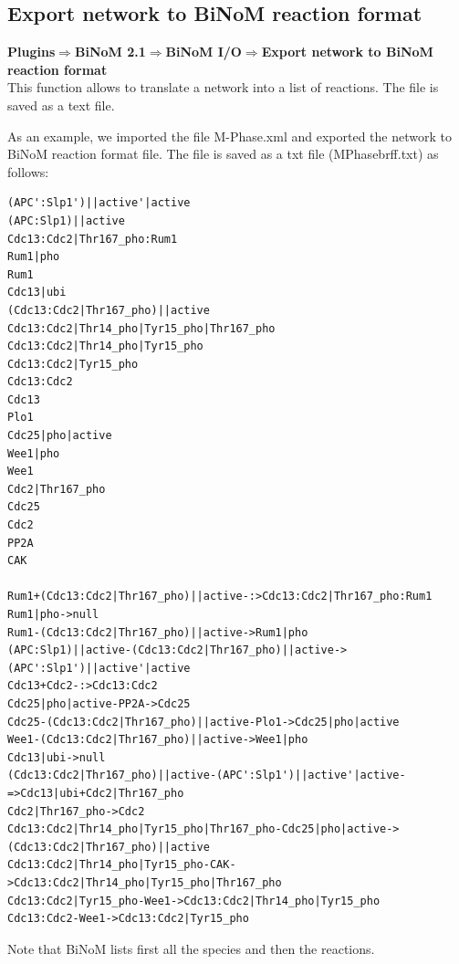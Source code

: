 \subsection{Export network to BiNoM reaction format}
\textbf{Plugins$\Rightarrow$BiNoM 2.1$\Rightarrow$BiNoM I/O$\Rightarrow$Export network to BiNoM reaction format}\\

This function allows to translate a network into a list of reactions. The file is saved as a text file.

As an example, we imported the file M-Phase.xml and exported the network to BiNoM reaction format file. The file is saved as a txt file (MPhasebrff.txt) as follows: 

\begin{verbatim}
(APC':Slp1')||active'|active
(APC:Slp1)||active
Cdc13:Cdc2|Thr167_pho:Rum1
Rum1|pho
Rum1
Cdc13|ubi
(Cdc13:Cdc2|Thr167_pho)||active
Cdc13:Cdc2|Thr14_pho|Tyr15_pho|Thr167_pho
Cdc13:Cdc2|Thr14_pho|Tyr15_pho
Cdc13:Cdc2|Tyr15_pho
Cdc13:Cdc2
Cdc13
Plo1
Cdc25|pho|active
Wee1|pho
Wee1
Cdc2|Thr167_pho
Cdc25
Cdc2
PP2A
CAK

Rum1+(Cdc13:Cdc2|Thr167_pho)||active-:>Cdc13:Cdc2|Thr167_pho:Rum1
Rum1|pho->null
Rum1-(Cdc13:Cdc2|Thr167_pho)||active->Rum1|pho
(APC:Slp1)||active-(Cdc13:Cdc2|Thr167_pho)||active->(APC':Slp1')||active'|active
Cdc13+Cdc2-:>Cdc13:Cdc2
Cdc25|pho|active-PP2A->Cdc25
Cdc25-(Cdc13:Cdc2|Thr167_pho)||active-Plo1->Cdc25|pho|active
Wee1-(Cdc13:Cdc2|Thr167_pho)||active->Wee1|pho
Cdc13|ubi->null
(Cdc13:Cdc2|Thr167_pho)||active-(APC':Slp1')||active'|active-=>Cdc13|ubi+Cdc2|Thr167_pho
Cdc2|Thr167_pho->Cdc2
Cdc13:Cdc2|Thr14_pho|Tyr15_pho|Thr167_pho-Cdc25|pho|active->(Cdc13:Cdc2|Thr167_pho)||active
Cdc13:Cdc2|Thr14_pho|Tyr15_pho-CAK->Cdc13:Cdc2|Thr14_pho|Tyr15_pho|Thr167_pho
Cdc13:Cdc2|Tyr15_pho-Wee1->Cdc13:Cdc2|Thr14_pho|Tyr15_pho
Cdc13:Cdc2-Wee1->Cdc13:Cdc2|Tyr15_pho
\end{verbatim}

Note that BiNoM lists first all the species and then the reactions. 


